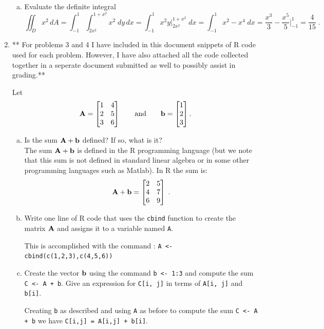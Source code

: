 \documentclass[letterpaper,12pt,fleqn]{article}
\begin{document}
\begin{enumerate}
\begin{enumerate}[a)]
\item Evaluate the definite integral
\begin{equation*}
\iint_{D} x^{2} \, dA = \int_{-1}^{1} \int_{2x^2}^{1+x^2} x^2 \; dy\,dx = \int_{-1}^{1} x^2y \big\rvert_{2x^2}^{1+x^2} \;dx = \int_{-1}^{1} x^2-x^4 \;dx = \frac{x^3}{3}-\frac{x^5}{5}\big\rvert_{-1}^{1}=\frac{4}{15} \;.
\end{equation*}

\end{enumerate}

\vspace{2em}


\item ** For problems 3 and 4 I have included in this document snippets of R code used for each problem. However, I have also attached all the code collected together in a seperate document submitted as well to possibly assist in grading.**

Let
\begin{equation*}
{\bf A} = \begin{bmatrix} 1 & 4 \\ 2 & 5 \\ 3 & 6 \end{bmatrix} \qquad \mbox{and} \qquad {\bf b} = \begin{bmatrix} 1 \\ 2 \\ 3 \end{bmatrix}.
\end{equation*}

\begin{enumerate}[a)]
\item Is the sum ${\bf A} + {\bf b}$ defined?  If so, what is it? \\

The sum ${\bf A} + {\bf b}$ is defined in the R programming language (but we note that this sum is not defined in standard linear algebra or in some other programming languages such as Matlab). In R the sum is:
$${\bf A} + {\bf b} = \begin{bmatrix} 2 & 5 \\ 4 & 7 \\ 6 &  9\end{bmatrix} \;.$$
\item Write one line of R code that uses the \texttt{cbind} function to create the matrix ${\bf A}$ and assigns it to a variable named \texttt{A}.

This is accomplished with the command : \texttt{A <- cbind(c(1,2,3),c(4,5,6))}

\item Create the vector ${\bf b}$ using the command \texttt{b <- 1:3} and compute the sum \texttt{C <- A + b}.  Give an expression for \texttt{C[i, j]} in terms of \texttt{A[i, j]} and \texttt{b[i]}.

Creating \texttt{b} as described and using \texttt{A} as before to compute the sum \texttt{C <- A + b} we have \texttt{C[i,j] = A[i,j] + b[i]}.
\end{enumerate}

\end{enumerate}
\end{document}
